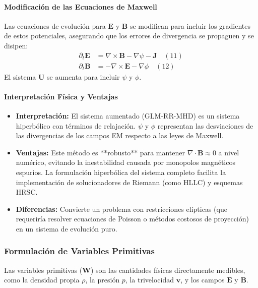 \paragraph{Modificación de las Ecuaciones de Maxwell}
Las ecuaciones de evolución para $\mathbf{E}$ y $\mathbf{B}$ se modifican para incluir los gradientes de estos potenciales, asegurando que los errores de divergencia se propaguen y se disipen:
\begin{align}
\partial_t \mathbf{E} &= \nabla \times \mathbf{B} - \nabla\psi - \mathbf{J} \quad (11) \\
\partial_t \mathbf{B} &= -\nabla \times \mathbf{E} - \nabla\phi \quad (12)
\end{align}
El sistema $\mathbf{U}$ se aumenta para incluir $\psi$ y $\phi$.

\paragraph{Interpretación Física y Ventajas}
\begin{itemize}
    \item \textbf{Interpretación:} El sistema aumentado (GLM-RR-MHD) es un sistema hiperbólico con términos de relajación. $\psi$ y $\phi$ representan las desviaciones de las divergencias de los campos EM respecto a las leyes de Maxwell.
    \item \textbf{Ventajas:} Este método es **robusto** para mantener $\nabla \cdot \mathbf{B} \approx 0$ a nivel numérico, evitando la inestabilidad causada por monopolos magnéticos espurios. La formulación hiperbólica del sistema completo facilita la implementación de solucionadores de Riemann (como HLLC) y esquemas HRSC.
    \item \textbf{Diferencias:} Convierte un problema con restricciones elípticas (que requeriría resolver ecuaciones de Poisson o métodos costosos de proyección) en un sistema de evolución puro.
\end{itemize}

\subsubsection{Formulación de Variables Primitivas}

Las variables primitivas ($\mathbf{W}$) son las cantidades físicas directamente medibles, como la densidad propia $\rho$, la presión $p$, la trivelocidad $\mathbf{v}$, y los campos $\mathbf{E}$ y $\mathbf{B}$.

